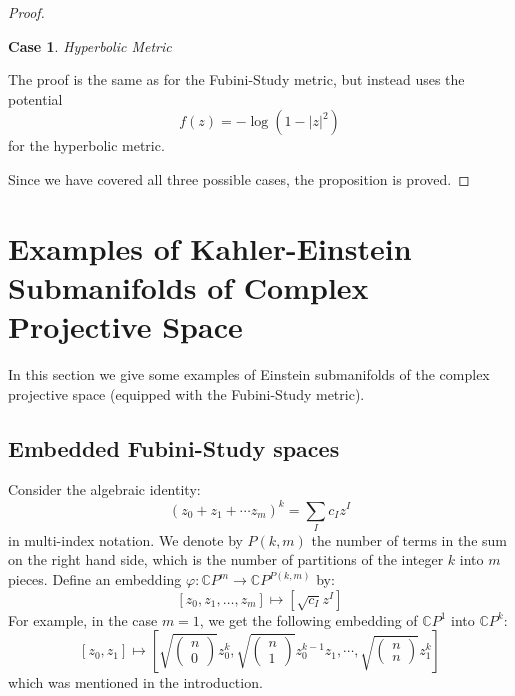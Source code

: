 \documentclass[11pt]{amsart}
\newtheorem{case}{Case}
\theoremstyle{definition}
\def \CP{ \mathbb{C}P }
\begin{document}
\begin{proof}
\begin{case} Hyperbolic Metric
\end{case}

The proof is the same as for the Fubini-Study metric, but instead uses the potential
%
$$ f(z) = - \log( 1 - |z|^2 ) $$
%
for the hyperbolic metric.

Since we have covered all three possible cases, the proposition is proved.
\end{proof}

\section{ Examples of Kahler-Einstein Submanifolds of Complex Projective Space }

In this section we give some examples of Einstein submanifolds of the complex projective space (equipped with the Fubini-Study metric).

\subsection{ Embedded Fubini-Study spaces }

Consider the algebraic identity:
%
$$ (z_0 + z_1 + \cdots z_m )^k = \sum_I c_I z^I $$
%
in multi-index notation.  We denote by $P(k,m)$ the number of terms in the sum on the right hand side, which is the number of partitions of the integer $k$ into $m$ pieces.  Define an embedding $\varphi : \CP^m \rightarrow \CP^{P(k,m)}$ by:
%
$$ [z_0, z_1, \ldots, z_m ] \mapsto [ \sqrt{ c_I } z^I ] $$
%
For example, in the case $m=1$, we get the following embedding of $\CP^1$ into $\CP^k$:
%
$$ [z_0, z_1] \mapsto \left[ \sqrt{ \left( \begin{array}{c} n \\ 0 \end{array} \right) } z_0^k, \sqrt{ \left( \begin{array}{c} n \\ 1 \end{array} \right) } z_0^{k-1} z_1, \cdots, \sqrt{ \left( \begin{array}{c} n \\ n \end{array} \right) } z_1^k \right] $$ 
%
which was mentioned in the introduction.
\end{document}
